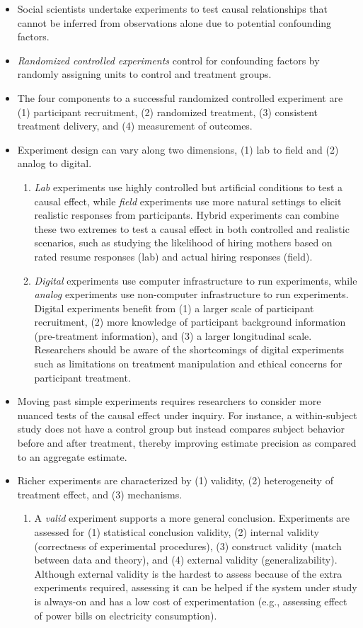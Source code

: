 \documentclass[11pt,letterpaper]{article}
\begin{document}
\begin{itemize}
\item Social scientists undertake experiments to test causal relationships that cannot be inferred from observations alone due to potential confounding factors. 
\item \emph{Randomized controlled experiments} control for confounding factors by randomly assigning units to control and treatment groups. 
\item The four components to a successful randomized controlled experiment are (1) participant recruitment, (2) randomized treatment, (3) consistent treatment delivery, and (4) measurement of outcomes. 
\item Experiment design can vary along two dimensions, (1) lab to field and (2) analog to digital. 
\begin{enumerate}
\item \emph{Lab} experiments use highly controlled but artificial conditions to test a causal effect, while \emph{field} experiments use more natural settings to elicit realistic responses from participants. Hybrid experiments can combine these two extremes to test a causal effect in both controlled and realistic scenarios, such as studying the likelihood of hiring mothers based on rated resume responses (lab) and actual hiring responses (field).
\item \emph{Digital} experiments use computer infrastructure to run experiments, while \emph{analog} experiments use non-computer infrastructure to run experiments. Digital experiments benefit from (1) a larger scale of participant recruitment, (2) more knowledge of participant background information (pre-treatment information), and (3) a larger longitudinal scale. Researchers should be aware of the shortcomings of digital experiments such as limitations on treatment manipulation and ethical concerns for participant treatment.
\end{enumerate}
\item Moving past simple experiments requires researchers to consider more nuanced tests of the causal effect under inquiry. For instance, a within-subject study does not have a control group but instead compares subject behavior before and after treatment, thereby improving estimate precision as compared to an aggregate estimate.
\item Richer experiments are characterized by (1) validity, (2) heterogeneity of treatment effect, and (3) mechanisms.
\begin{enumerate}
\item A \emph{valid} experiment supports a more general conclusion. Experiments are assessed for (1) statistical conclusion validity, (2) internal validity (correctness of experimental procedures), (3) construct validity (match between data and theory), and (4) external validity (generalizability). Although external validity is the hardest to assess because of the extra experiments required, assessing it can be helped if the system under study is always-on and has a low cost of experimentation (e.g., assessing effect of power bills on electricity consumption).

\end{enumerate}
\end{itemize}
\end{document}
